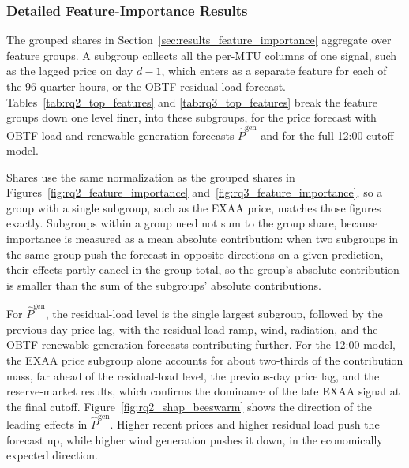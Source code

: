 \FloatBarrier

\subsubsection{Detailed Feature-Importance Results}
\label{app:feature_details}

The grouped shares in Section~\ref{sec:results_feature_importance} aggregate over
feature groups. A subgroup collects all the per-MTU columns of
one signal, such as the lagged price on day \(d-1\), which enters as a separate
feature for each of the 96 quarter-hours, or the OBTF residual-load forecast.
Tables~\ref{tab:rq2_top_features} and \ref{tab:rq3_top_features} break the feature
groups down one level finer, into these subgroups, for the price forecast with
OBTF load and renewable-generation forecasts \(\hat{P}^{\mathrm{gen}}\) and for the full 12:00 cutoff
model.

Shares use the same normalization as the grouped shares in
Figures~\ref{fig:rq2_feature_importance} and~\ref{fig:rq3_feature_importance}, so
a group with a single subgroup, such as the EXAA price, matches those figures
exactly. Subgroups within a group need not sum to the group share, because
importance is measured as a mean absolute contribution: when two subgroups in the
same group push the forecast in opposite directions on a given prediction, their
effects partly cancel in the group total, so the group's absolute contribution is
smaller than the sum of the subgroups' absolute contributions.

For \(\hat{P}^{\mathrm{gen}}\), the residual-load level is the single largest
subgroup, followed by the previous-day price lag, with the residual-load ramp,
wind, radiation, and the OBTF renewable-generation forecasts contributing further.
For the 12:00 model, the EXAA price subgroup alone accounts for about
two-thirds of the contribution mass, far ahead of the residual-load level, the
previous-day price lag, and the reserve-market results, which confirms the dominance of the late EXAA signal
at the final cutoff. Figure~\ref{fig:rq2_shap_beeswarm} shows the direction of the
leading effects in \(\hat{P}^{\mathrm{gen}}\). Higher recent prices and higher
residual load push the forecast up, while higher wind generation pushes it down,
in the economically expected direction.

